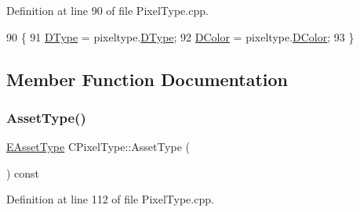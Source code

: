 Definition at line 90 of file Pixel\+Type.\+cpp.


\begin{DoxyCode}
90                                                  \{
91     \hyperlink{classCPixelType_aca37f042b510a349e0d3209c73ae51c5}{DType} = pixeltype.\hyperlink{classCPixelType_aca37f042b510a349e0d3209c73ae51c5}{DType};
92     \hyperlink{classCPixelType_a474243cf748aee94cfa207659e940b6c}{DColor} = pixeltype.\hyperlink{classCPixelType_a474243cf748aee94cfa207659e940b6c}{DColor};
93 \}
\end{DoxyCode}


\subsection{Member Function Documentation}
\hypertarget{classCPixelType_addcf6c6d11e8ebafe4455beaa995b675}{}\label{classCPixelType_addcf6c6d11e8ebafe4455beaa995b675} 
\subsubsection{\texorpdfstring{Asset\+Type()}{AssetType()}}
{\footnotesize\ttfamily \hyperlink{GameDataTypes_8h_a5600d4fc433b83300308921974477fec}{E\+Asset\+Type} C\+Pixel\+Type\+::\+Asset\+Type (\begin{DoxyParamCaption}{ }\end{DoxyParamCaption}) const}



Definition at line 112 of file Pixel\+Type.\+cpp.


